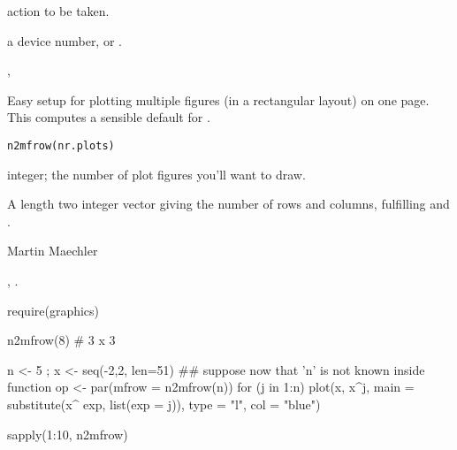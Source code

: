 %
\begin{Arguments}
\begin{ldescription}
\item[\code{type}] action to be taken.
\item[\code{which}] a device number, or .
\end{ldescription}
\end{Arguments}
%
\begin{SeeAlso}\relax
{}, 
\end{SeeAlso}
%
\begin{Description}\relax
Easy setup for plotting multiple figures (in a rectangular layout) on
one page.  This computes a sensible default for
.
\end{Description}
%
\begin{Usage}
\begin{verbatim}
n2mfrow(nr.plots)
\end{verbatim}
\end{Usage}
%
\begin{Arguments}
\begin{ldescription}
\item[\code{nr.plots}] integer; the number of plot figures you'll want to draw.
\end{ldescription}
\end{Arguments}
%
\begin{Value}
A length two integer vector  giving the number of rows
and columns, fulfilling  and .
\end{Value}
%
\begin{Author}\relax
Martin Maechler
\end{Author}
%
\begin{SeeAlso}\relax
{}, .
\end{SeeAlso}
%
\begin{Examples}
\begin{ExampleCode}
require(graphics)

n2mfrow(8) # 3 x 3

n <- 5 ; x <- seq(-2,2, len=51)
## suppose now that 'n' is not known {inside function}
op <- par(mfrow = n2mfrow(n))
for (j in 1:n)
   plot(x, x^j, main = substitute(x^ exp, list(exp = j)), type = "l",
   col = "blue")

sapply(1:10, n2mfrow)
\end{ExampleCode}
\end{Examples}
